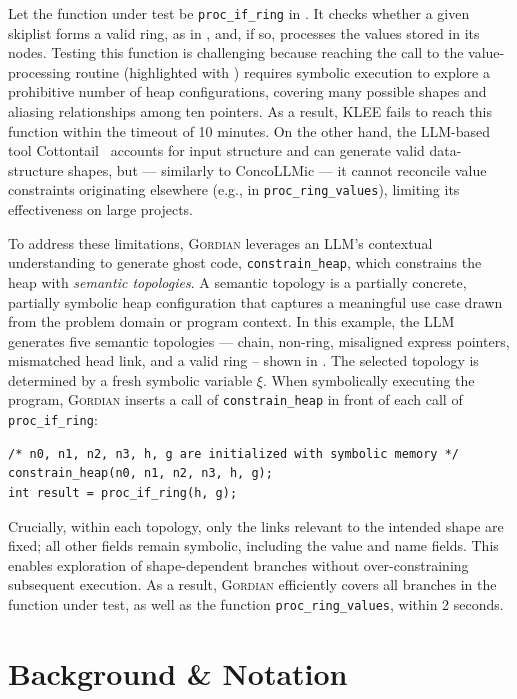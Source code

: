 \documentclass[acmsmall,screen,nonacm]{acmart}
\newcommand{\projName}{\textsc{Gordian}\xspace}
\theoremstyle{definition}
\begin{document}
Let the function under test be \texttt{proc_if_ring} in . It checks whether a given skiplist forms a valid ring, as in , and, if so, processes the values stored in its nodes. Testing this function is challenging because reaching the call to the value-processing routine (highlighted with \hlg{\phantom{X}}) requires symbolic execution to explore a prohibitive number of heap configurations, covering many possible shapes and aliasing relationships among ten pointers. As a result, KLEE fails to reach this function within the timeout of 10 minutes. On the other hand, the LLM-based tool Cottontail~\cite{cottontail} accounts for input structure and can generate valid data-structure shapes, but --- similarly to ConcoLLMic --- it cannot reconcile value constraints originating elsewhere (e.g., in \texttt{proc\_ring\_values}), limiting its effectiveness on large projects.

To address these limitations, \projName leverages an LLM's contextual understanding to generate ghost code, \texttt{constrain\_heap}, which constrains the heap with \emph{semantic topologies}. A semantic topology is a partially concrete, partially symbolic heap configuration that captures a meaningful use case drawn from the problem domain or program context. In this example, the LLM generates five semantic topologies --- chain, non-ring, misaligned express pointers, mismatched head link, and a valid ring -- shown in . The selected topology is determined by a fresh symbolic variable $\xi$. When symbolically executing the program, \projName inserts a call of \texttt{constrain\_heap} in front of each call of \texttt{proc_if_ring}:

{\scriptsize
\begin{verbatim}
/* n0, n1, n2, n3, h, g are initialized with symbolic memory */
constrain_heap(n0, n1, n2, n3, h, g);
int result = proc_if_ring(h, g);
\end{verbatim}
}

\noindent Crucially, within each topology, only the links relevant to the intended shape are fixed; all other fields remain symbolic, including the value and name fields. This enables exploration of shape-dependent branches without over-constraining subsequent execution. As a result, \projName efficiently covers all branches in the function under test, as well as the function \texttt{proc\_ring\_values}, within 2 seconds.

\section{Background \& Notation}
\end{document}
